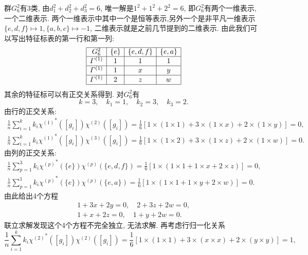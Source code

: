 \documentclass[UTF8]{ctexart}
\begin{document}
群$G_6^2$有3类, 由$d_1^2 + d_2^2 + d_3^2 = 6$, 唯一解是$1^2 + 1^2 + 2^2 = 6$, 即$G_6^2$有两个一维表示, 一个二维表示. 两个一维表示中其中一个是恒等表示,另外一个是非平凡一维表示$\{e, d, f\} \mapsto 1, \{a, b, c\} \mapsto -1$, 二维表示就是之前几节提到的二维表示. 由此我们可以写出特征标表的第一行和第一列:
\begin{equation}
  \begin{array}{|c|c|c|c|}
    \hline
    G_6^2 & \{e\} & \{e, d, f\} & \{e, a\} \\
    \hline
    \varGamma^{(1)} & 1 & 1 & 1 \\
    \hline
    \varGamma^{(1)} & 1 & x & y \\
    \hline
    \varGamma^{(1)} & 2 & z & w \\
    \hline
  \end{array}
\end{equation}
其余的特征标可以有正交关系得到. 对$G_6^2$有
\begin{equation}
  k = 3, \quad k_1 = 1,\quad k_2 = 3,\quad k_3 = 2.
\end{equation}
由行的正交关系:
\begin{gather}
  \frac{1}{n} \sum_{i=1}^k k_i {\chi^{(1)}}^{*} ([g_i]) \chi^{(2)}([g_i]) = \frac{1}{6} [1\times (1 \times 1) + 3 \times (1 \times x) + 2 \times (1 \times y)] = 0, \\
  \frac{1}{n} \sum_{i=1}^k k_i {\chi^{(1)}}^{*} ([g_i]) \chi^{(3)}([g_i]) = \frac{1}{6} [1\times (1 \times 2) + 3 \times (1 \times z) + 2 \times (1 \times w)] = 0.
\end{gather}
由列的正交关系:
\begin{gather}
  \frac{1}{n} \sum_{p=1}^3 k_i {\chi^{(p)}}^{*} (\{e\}) \chi^{(p)}(\{e,d,f\}) = \frac{1}{6} [1\times (1\times 1 + 1 \times x + 2 \times z)] = 0, \\
  \frac{1}{n} \sum_{p=1}^1 k_i {\chi^{(p)}}^{*} (\{e\}) \chi^{(p)}(\{e, a\}) = \frac{1}{6} [1\times (1 \times 1 + 1 \times y + 2 \times w)] = 0.
\end{gather}
由此给出4个方程
\begin{gather}
  1 + 3x + 2y = 0, \quad 2 + 3z + 2w = 0, \\
  1 + x + 2z = 0, \quad 1 + y + 2w = 0.
\end{gather}
联立求解发现这个4个方程不完全独立, 无法求解. 再考虑行归一化关系
\begin{equation}
  \frac{1}{n} \sum_{i=1}^k k_i {\chi^{(2)}}^{*} ([g_i]) \chi^{(2)}([g_i]) = \frac{1}{6} [1\times (1 \times 1) + 3 \times (x \times x) + 2 \times (y \times y)] = 1,
\end{equation}
\end{document}
